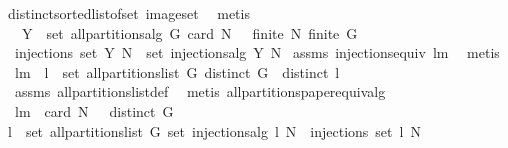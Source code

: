 \begin{isabellebody}
distinct{\isacharunderscore}sorted{\isacharunderscore}list{\isacharunderscore}of{\isacharunderscore}set\ image{\isacharunderscore}set\ \isamarkupfalse%
\ metis%
\endisatagproof
{\isafoldproof}%
%
\isadelimproof
\isanewline
%
\endisadelimproof
\isanewline
{}\isamarkupfalse%
\ \ {\isachardoublequoteopen}Y\ {\isasymin}\ set\ {\isacharparenleft}all{\isacharunderscore}partitions{\isacharunderscore}alg\ G{\isacharparenright}{\isachardoublequoteclose}\ {\isachardoublequoteopen}card\ N\ {\isachargreater}\ {}{\isachardoublequoteclose}\ {\isachardoublequoteopen}finite\ N{\isachardoublequoteclose}\ {\isachardoublequoteopen}finite\ G{\isachardoublequoteclose}\ \isanewline
{}\ {\isachardoublequoteopen}injections\ {\isacharparenleft}set\ Y{\isacharparenright}\ N\ {\isacharequal}\ set\ {\isacharparenleft}injections{\isacharunderscore}alg\ Y\ N{\isacharparenright}{\isachardoublequoteclose}\isanewline
%
\isadelimproof
%
\endisadelimproof
%
\isatagproof
{}\isamarkupfalse%
\ assms\ injections{\isacharunderscore}equiv\ lm{}{}\ \isamarkupfalse%
\ metis%
\endisatagproof
{\isafoldproof}%
%
\isadelimproof
\isanewline
%
\endisadelimproof
\isanewline
{}\isamarkupfalse%
\ lm{}{}{\isacharcolon}\ \ {\isachardoublequoteopen}l\ {\isasymin}\ set\ {\isacharparenleft}all{\isacharunderscore}partitions{\isacharunderscore}list\ G{\isacharparenright}{\isachardoublequoteclose}\ {\isachardoublequoteopen}distinct\ G{\isachardoublequoteclose}\ \ {\isachardoublequoteopen}distinct\ l{\isachardoublequoteclose}\ \isanewline
%
\isadelimproof
%
\endisadelimproof
%
\isatagproof
{}\isamarkupfalse%
\ assms\ all{\isacharunderscore}partitions{\isacharunderscore}list{\isacharunderscore}def\ \isamarkupfalse%
\ {\isacharparenleft}metis\ all{\isacharunderscore}partitions{\isacharunderscore}paper{\isacharunderscore}equiv{\isacharunderscore}alg{\isacharprime}{\isacharparenright}%
\endisatagproof
{\isafoldproof}%
%
\isadelimproof
\isanewline
%
\endisadelimproof
{}\isamarkupfalse%
\ lm{}{}{\isacharcolon}\ \ {\isachardoublequoteopen}card\ N\ {\isachargreater}\ {}{\isachardoublequoteclose}\ {\isachardoublequoteopen}distinct\ G{\isachardoublequoteclose}\ \ \isanewline
{\isachardoublequoteopen}{\isasymforall}l\ {\isasymin}\ set\ {\isacharparenleft}all{\isacharunderscore}partitions{\isacharunderscore}list\ G{\isacharparenright}{\isachardot}\ set\ {\isacharparenleft}injections{\isacharunderscore}alg\ l\ N{\isacharparenright}\ {\isacharequal}\ injections\ {\isacharparenleft}set\ l{\isacharparenright}\ N{\isachardoublequoteclose}\isanewline

\end{isabellebody}
